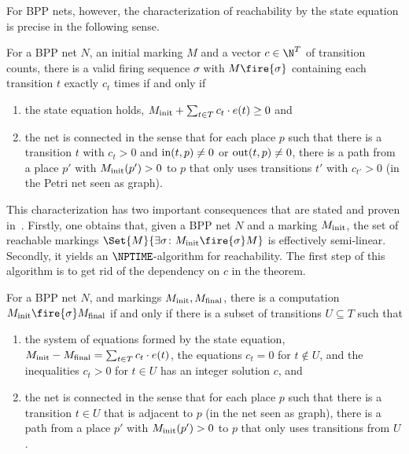 \documentclass[../../diss.tex]{subfiles}
\begin{document}
For BPP nets, however, the characterization of reachability by the state equation is precise in the following sense.

\begin{theorem}
    For a BPP net $N$, an initial marking $M$ and a vector $c \in \N^T$ of transition counts, there is a valid firing sequence $\sigma$ with $M \fire{\sigma}$ containing each transition $t$ exactly $c_t$ times if and only if
    \begin{enumerate}[(1)]
        \item the state equation holds, \ie \( M_{\text{init}} + \sum_{t \in T} c_t \cdot e(t) \geq 0 \) and
        \item the net is connected in the sense that for each place $p$ such that there is a transition $t$ with $c_t > 0$ and $\text{in}(t,p) \neq 0$ or $\text{out}(t,p) \neq 0$, there is a path from a place $p'$ with $M_{\text{init}}(p') > 0$ to $p$ that only uses transitions $t'$ with $c_{t'} > 0$ (in the Petri net seen as graph).
    \end{enumerate}
\end{theorem}


This characterization has two important consequences that are stated and proven in~\cite{Esparza97a}.
Firstly, one obtains that, given a BPP net $N$ and a marking $M_{\text{init}}$, the set of reachable markings $\Set{ M }{ \exists \sigma \colon \Minit \fire{\sigma} M}$ is effectively semi-linear.
Secondly, it yields an $\NPTIME$-algorithm for reachability.
The first step of this algorithm is to get rid of the dependency on $c$ in the theorem.

\begin{corollary}
    For a BPP net $N$, and markings $M_{\text{init}}, M_{\text{final}}$, there is a computation $\Minit \fire{\sigma} \Mfinal$ if and only if there is a subset of transitions $U \subseteq T$ such that
    \begin{enumerate}[(1)]
        \item the system of equations formed by the state equation, \ie \( M_{\text{init}} - M_{\text{final}} = \sum_{t \in T} c_t \cdot e(t) \), the equations $c_t = 0$ for $t \not\in U$, and the inequalities $c_t > 0$ for $t \in U$ has an integer solution $c$, and
        \item the net is connected in the sense that for each place $p$ such that there is a transition $t \in U$ that is adjacent to $p$ (in the net seen as graph), there is a path from a place $p'$ with $M_{\text{init}}(p') > 0$ to $p$ that only uses transitions from $U$.
    \end{enumerate}
\end{corollary}
\end{document}
